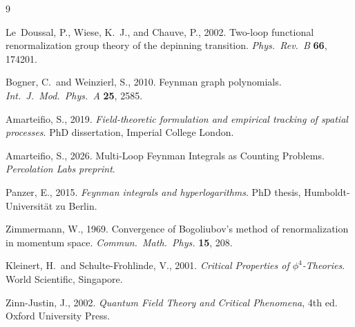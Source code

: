 \documentclass[10pt,a4paper,twocolumn]{article}
\theoremstyle{plain}
\theoremstyle{definition}
\begin{document}
\begin{thebibliography}{9}

  Le~Doussal, P., Wiese, K.~J., and Chauve, P., 2002.
  Two-loop functional renormalization group theory of the depinning
  transition.
  \textit{Phys.\ Rev.\ B} \textbf{66}, 174201.

  Bogner, C.\ and Weinzierl, S., 2010.
  Feynman graph polynomials.
  \textit{Int.\ J.\ Mod.\ Phys.\ A} \textbf{25}, 2585.

  Amarteifio, S., 2019.
  \textit{Field-theoretic formulation and empirical tracking of
  spatial processes}.
  PhD dissertation, Imperial College London.

  Amarteifio, S., 2026.
  Multi-Loop Feynman Integrals as Counting Problems.
  \textit{Percolation Labs preprint}.

  Panzer, E., 2015.
  \textit{Feynman integrals and hyperlogarithms}.
  PhD thesis, Humboldt-Universit\"at zu Berlin.

  Zimmermann, W., 1969.
  Convergence of Bogoliubov's method of renormalization in momentum space.
  \textit{Commun.\ Math.\ Phys.} \textbf{15}, 208.

  Kleinert, H.\ and Schulte-Frohlinde, V., 2001.
  \textit{Critical Properties of $\phi^4$-Theories}.
  World Scientific, Singapore.

  Zinn-Justin, J., 2002.
  \textit{Quantum Field Theory and Critical Phenomena}, 4th ed.
  Oxford University Press.

\end{thebibliography}
\end{document}
